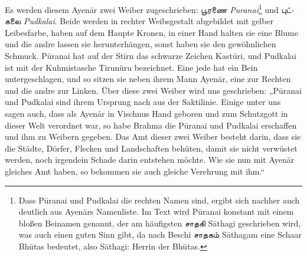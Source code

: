 \documentclass{article}
\newcommand{\TamilText}[1]{\texttamil{#1}}
\newcommand{\tam}[1]{\TamilText{#1}}
\begin{document}
Es werden diesem Ayen\={a}r zwei Weiber zugeschrieben: \tam{பூரணை} \emph{Puranai}\footnote{Dass P\={u}ranai und Pudkalai die rechten Namen sind, ergibt sich nachher auch deutlich aus Ayen\={a}rs Namenliste. Im Text wird P\={u}ranai konstant mit einem bloßen Beinamen genannt, der am häufigsten \tam{சாதகி} S\={a}thagi geschrieben wird, was auch einen guten Sinn gibt, da nach Beschi \tam{சாதகம்} S\={a}thagam eine Schaar Bh\={u}tas bedeutet, also S\={a}thagi: Herrin der Bh\={u}tas.} und \tam{புட்கலை} \emph{Pudkalai}. Beide werden in rechter Weibsgestalt abgebildet mit gelber Leibesfarbe, haben auf dem Haupte Kronen, in einer Hand halten sie eine Blume und die andre lassen sie herunterhängen, sonst haben sie den gewöhnlichen Schmuck. P\={u}ranai hat auf der Stirn das schwarze Zeichen Kast\={u}ri, und Pudkalai ist mit der Kuhmistasche Tirunüru bezeichnet. Eine jede hat ein Bein untergeschlagen, und so sitzen sie neben ihrem Mann Ayen\={a}r, eine zur Rechten und die andre zur Linken. Über diese zwei Weiber wird uns geschrieben: „P\={u}ranai und Pudkalai sind ihrem Ursprung nach aus der Saktilinie. Einige unter uns sagen auch, dass als Ayen\={a}r in Vischnus Hand geboren und zum Schutzgott in dieser Welt verordnet war, so habe Brahma die P\={u}ranai und Pudkalai erschaffen und ihm zu Weibern gegeben. Das Amt dieser zwei Weiber besteht darin, dass sie die Städte, Dörfer, Flecken und Landschaften behüten, damit sie nicht verwüstet werden, noch irgendein Schade darin entstehen möchte. Wie sie nun mit Ayen\={a}r gleiches Amt haben, so bekommen sie auch gleiche Verehrung mit ihm.“
\end{document}
